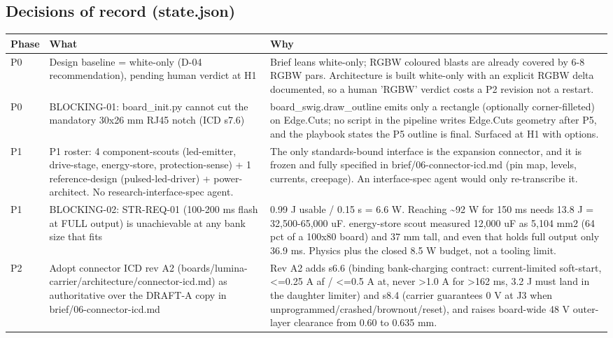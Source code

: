 \documentclass[11pt,a4paper]{article}
\begin{document}
\subsection*{Decisions of record (state.json)}
{\small
\begin{longtable}{lp{5.2cm}p{7.2cm}}
\toprule
\textbf{Phase} & \textbf{What} & \textbf{Why} \\
\midrule
\endhead
P0 & Design baseline = white-only (D-04 recommendation), pending human verdict at H1 & Brief leans white-only; RGBW coloured blasts are already covered by 6-8 RGBW pars. Architecture is built white-only with an explicit RGBW delta documented, so a human 'RGBW' verdict costs a P2 revision not a restart. \\
P0 & BLOCKING-01: board\_init.py cannot cut the mandatory 30x26 mm RJ45 notch (ICD s7.6) & board\_swig.draw\_outline emits only a rectangle (optionally corner-filleted) on Edge.Cuts; no script in the pipeline writes Edge.Cuts geometry after P5, and the playbook states the P5 outline is final. Surfaced at H1 with options. \\
P1 & P1 roster: 4 component-scouts (led-emitter, drive-stage, energy-store, protection-sense) + 1 reference-design (pulsed-led-driver) + power-architect. No research-interface-spec agent. & The only standards-bound interface is the expansion connector, and it is frozen and fully specified in brief/06-connector-icd.md (pin map, levels, currents, creepage). An interface-spec agent would only re-transcribe it. \\
P1 & BLOCKING-02: STR-REQ-01 (100-200 ms flash at FULL output) is unachievable at any bank size that fits & 0.99 J usable / 0.15 s = 6.6 W. Reaching \textasciitilde{}92 W for 150 ms needs 13.8 J = 32,500-65,000 uF. energy-store scout measured 12,000 uF as 5,104 mm2 (64 pct of a 100x80 board) and 37 mm tall, and even that holds full output only 36.9 ms. Physics plus the closed 8.5 W budget, not a tooling limit. \\
P2 & Adopt connector ICD rev A2 (boards/lumina-carrier/architecture/connector-icd.md) as authoritative over the DRAFT-A copy in brief/06-connector-icd.md & Rev A2 adds s6.6 (binding bank-charging contract: current-limited soft-start, \textless{}=0.25 A af / \textless{}=0.5 A at, never \textgreater{}1.0 A for \textgreater{}162 ms, 3.2 J must land in the daughter limiter) and s8.4 (carrier guarantees 0 V at J3 when unprogrammed/crashed/brownout/reset), and raises board-wide 48 V outer-layer clearance from 0.60 to 0.635 mm. \\

\end{longtable}}
\end{document}
